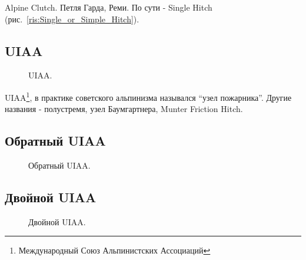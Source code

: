Alpine Clutch. Петля Гарда, Реми. По сути - Single Hitch (рис.~\ref{ris:Single_or_Simple_Hitch}).

\subsection{UIAA}

\begin{figure}[H]\centering
	\subfloat[Завязывание]{\label{ris:UIAA_1}
	\tcbox[enhanced jigsaw,colframe=black,opacityframe=0.5,opacityback=0.5,height=8cm]
		{\centering
			}
		}
\hfil
	\subfloat[Результат]{\label{ris:UIAA_2}
	\tcbox[enhanced jigsaw,colframe=black,opacityframe=0.5,opacityback=0.5,height=8cm]
		{\centering
			}
		}
	\caption{UIAA.}\label{ris:UIAA}
\end{figure}

UIAA\footnote{Международный Союз Альпинистских Ассоциаций}, в практике советского альпинизма назывался \enquote{узел пожарника}. Другие названия - полустремя, узел Баумгартнера, Munter Friction Hitch.

\subsection{Обратный UIAA}

\begin{figure}[H]\centering
	\begin{minipage}{1\linewidth}
		\begin{center}
			\tcbox[enhanced jigsaw,colframe=black,opacityframe=0.5,opacityback=0.5]
			{\centering{}}
		\end{center}
	\end{minipage}
\caption{Обратный UIAA.}
\label{ris:UIAA_revers}
\end{figure}

\subsection{Двойной UIAA}

\begin{figure}[H]\centering
	\begin{minipage}{1\linewidth}
		\begin{center}
			\tcbox[enhanced jigsaw,colframe=black,opacityframe=0.5,opacityback=0.5]
			{\centering{}}
		\end{center}
	\end{minipage}
\caption{Двойной UIAA.}
\label{ris:Double_UIAA}
\end{figure}


